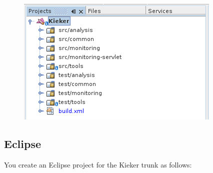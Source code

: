 \begin{compactenum}
\begin{compactenum}
\begin{figure}[H]\centering
\includegraphics[scale=0.4]{figures/netbeans-ProjectTree}
\caption{}
\label{fig:nb:projectTree}
\end{figure}
\end{compactenum}
\end{compactenum}

\subsection{Eclipse}

You create an Eclipse project for the Kieker trunk as follows:

